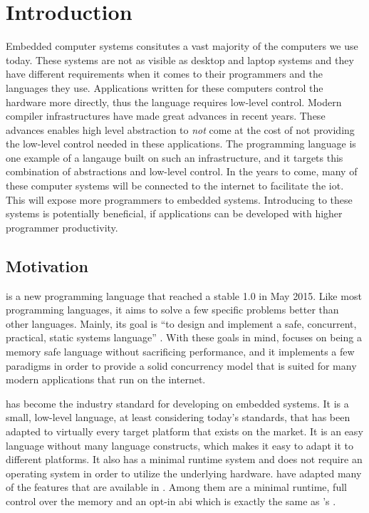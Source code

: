
\chapter{Introduction}
\label{chap:intro}

Embedded computer systems consitutes a vast majority of the computers we use today.
These systems are not as visible as desktop and laptop systems and they have different requirements when it comes to their programmers and the languages they use.
Applications written for these computers control the hardware more directly, thus the language requires low-level control.
Modern compiler infrastructures have made great advances in recent years.
These advances enables high level abstraction to \emph{not} come at the cost of not providing the low-level control needed in these applications.
The {\rust} programming language is one example of a langauge built on such an infrastructure, and it targets this combination of abstractions and low-level control.
In the years to come, many of these computer systems will be connected to the internet to facilitate the \glsdesc{iot}.
This will expose more programmers to embedded systems.
Introducing {\rust} to these systems is potentially beneficial, if applications can be developed with higher programmer productivity.


\section{Motivation} %
\label{sec:intro:rust_as_replacement_to_c}

{\rust} is a new programming language that reached a stable 1.0 in May 2015.
Like most programming languages, it aims to solve a few specific problems better than other languages.
Mainly, its goal is ``to design and implement a safe, concurrent, practical, static systems language'' \cite{web:rust_faq}.
With these goals in mind, {\rust} focuses on being a memory safe language without sacrificing performance, and it implements a few paradigms in order to provide a solid concurrency model that is suited for many modern applications that run on the internet.

{\C} has become the industry standard for developing on embedded systems.
It is a small, low-level language, at least considering today's standards, that has been adapted to virtually every target platform that exists on the market.
It is an easy language without many language constructs, which makes it easy to adapt it to different platforms.
It also has a minimal runtime system and does not require an operating system in order to utilize the underlying hardware.
{\rust} have adapted many of the features that are available in {\C}.
Among them are a minimal runtime, full control over the memory and an opt-in \gls{abi} which is exactly the same as {\C}'s \cite{web:rust_once_run_everywhere}.

